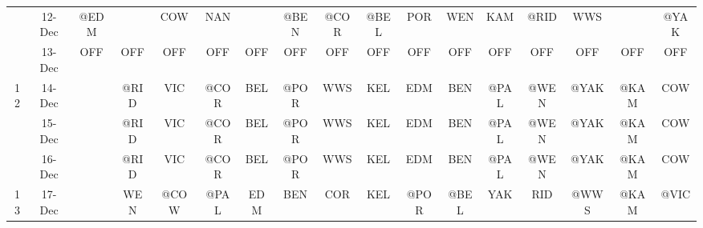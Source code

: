 \begin{table}[htbp]
\begin{tabular}{ccrrrrrrrrrrrrrrr}
          & 12-Dec & \multicolumn{1}{c}{@EDM} &       & \multicolumn{1}{c}{COW} & \multicolumn{1}{c}{NAN} &       & \multicolumn{1}{c}{@BEN} & \multicolumn{1}{c}{@COR} & \multicolumn{1}{c}{\cellcolor[rgb]{ .588,  .588,  .588}@BEL} & \multicolumn{1}{c}{POR} & \multicolumn{1}{c}{WEN} & \multicolumn{1}{c}{KAM} & \multicolumn{1}{c}{@RID} & \multicolumn{1}{c}{WWS} &       & \multicolumn{1}{c}{@YAK} \\
          & 13-Dec & \multicolumn{1}{c}{OFF} & \multicolumn{1}{c}{OFF} & \multicolumn{1}{c}{OFF} & \multicolumn{1}{c}{OFF} & \multicolumn{1}{c}{OFF} & \multicolumn{1}{c}{OFF} & \multicolumn{1}{c}{OFF} & \multicolumn{1}{c}{OFF} & \multicolumn{1}{c}{OFF} & \multicolumn{1}{c}{OFF} & \multicolumn{1}{c}{OFF} & \multicolumn{1}{c}{OFF} & \multicolumn{1}{c}{OFF} & \multicolumn{1}{c}{OFF} & \multicolumn{1}{c}{OFF} \\
    12    & 14-Dec &       & \multicolumn{1}{c}{@RID} & \multicolumn{1}{c}{VIC} & \multicolumn{1}{c}{@COR} & \multicolumn{1}{c}{BEL} & \multicolumn{1}{c}{@POR} & \multicolumn{1}{c}{WWS} & \multicolumn{1}{c}{KEL} & \multicolumn{1}{c}{EDM} & \multicolumn{1}{c}{\cellcolor[rgb]{ 1,  .6,  .8}BEN} & \multicolumn{1}{c}{@PAL} & \multicolumn{1}{c}{@WEN} & \multicolumn{1}{c}{@YAK} & \multicolumn{1}{c}{@KAM} & \multicolumn{1}{c}{COW} \\
          & 15-Dec &       & \multicolumn{1}{c}{@RID} & \multicolumn{1}{c}{VIC} & \multicolumn{1}{c}{@COR} & \multicolumn{1}{c}{BEL} & \multicolumn{1}{c}{@POR} & \multicolumn{1}{c}{WWS} & \multicolumn{1}{c}{KEL} & \multicolumn{1}{c}{EDM} & \multicolumn{1}{c}{\cellcolor[rgb]{ 1,  .6,  .8}BEN} & \multicolumn{1}{c}{@PAL} & \multicolumn{1}{c}{@WEN} & \multicolumn{1}{c}{@YAK} & \multicolumn{1}{c}{@KAM} & \multicolumn{1}{c}{COW} \\
          & 16-Dec &       & \multicolumn{1}{c}{@RID} & \multicolumn{1}{c}{VIC} & \multicolumn{1}{c}{@COR} & \multicolumn{1}{c}{BEL} & \multicolumn{1}{c}{@POR} & \multicolumn{1}{c}{WWS} & \multicolumn{1}{c}{KEL} & \multicolumn{1}{c}{EDM} & \multicolumn{1}{c}{\cellcolor[rgb]{ 1,  .6,  .8}BEN} & \multicolumn{1}{c}{@PAL} & \multicolumn{1}{c}{@WEN} & \multicolumn{1}{c}{@YAK} & \multicolumn{1}{c}{@KAM} & \multicolumn{1}{c}{COW} \\
    13    & 17-Dec &       & \multicolumn{1}{c}{WEN} & \multicolumn{1}{c}{@COW} & \multicolumn{1}{c}{@PAL} & \multicolumn{1}{c}{EDM} & \multicolumn{1}{c}{BEN} & \multicolumn{1}{c}{COR} & \multicolumn{1}{c}{KEL} & \multicolumn{1}{c}{@POR} & \multicolumn{1}{c}{@BEL} & \multicolumn{1}{c}{YAK} & \multicolumn{1}{c}{RID} & \multicolumn{1}{c}{@WWS} & \multicolumn{1}{c}{@KAM} & \multicolumn{1}{c}{@VIC} \\

\end{tabular}
\end{table}
